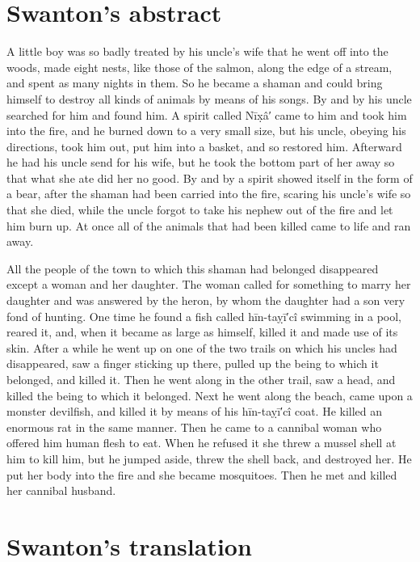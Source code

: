 \vspace{1\baselineskip}

\section{Swanton’s abstract}\label{sec:91-swanton-abstract}

A little boy was so badly treated by his uncle’s wife that he went off into the woods, made eight nests, like those of the salmon, along the edge of a stream, and spent as many nights in them.
So he became a shaman and could bring himself to destroy all kinds of animals by means of his songs.
By and by his uncle searched for him and found him.
A spirit called Nīx̣â′ came to him and took him into the fire, and he burned down to a very small size, but his uncle, obeying his directions, took him out, put him into a basket, and so restored him.
Afterward he had his uncle send for his wife, but he took the bottom part of her away so that what she ate did her no good.
By and by a spirit showed itself in the form of a bear, after the shaman had been carried into the fire, scaring his uncle’s wife so that she died, while the uncle forgot to take his nephew out of the fire and let him burn up.
At once all of the animals that had been killed came to life and ran away.

All the people of the town to which this shaman had belonged disappeared except a woman and her daughter.
The woman called for something to marry her daughter and was answered by the heron, by whom the daughter had a son very fond of hunting.
One time he found a fish called hīn-taỵī′cî swimming in a pool, reared it, and, when it became as large as himself, killed it and made use of its skin.
After a while he went up on one of the two trails on which his uncles had disappeared, saw a finger sticking up there, pulled up the being to which it belonged, and killed it.
Then he went along in the other trail, saw a head, and killed the being to which it belonged.
Next he went along the beach, came upon a monster devilfish, and killed it by means of his hīn-taỵī′cî coat.
He killed an enormous rat in the same manner.
Then he came to a cannibal woman who offered him human flesh to eat.
When he refused it she threw a mussel shell at him to kill him, but he jumped aside, threw the shell back, and destroyed her.
He put her body into the fire and she became mosquitoes.
Then he met and killed her cannibal husband.

\section{Swanton’s translation}\label{sec:91-swanton-translation}

